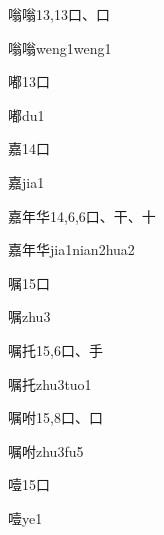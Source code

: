 \begin{entry}{嗡嗡}{13,13}{⼝、⼝}
  \begin{phonetics}{嗡嗡}{weng1weng1}
  \end{phonetics}
\end{entry}

\begin{entry}{嘟}{13}{⼝}
  \begin{phonetics}{嘟}{du1}
  \end{phonetics}
\end{entry}

\begin{entry}{嘉}{14}{⼝}
  \begin{phonetics}{嘉}{jia1}
  \end{phonetics}
\end{entry}

\begin{entry}{嘉年华}{14,6,6}{⼝、⼲、⼗}
  \begin{phonetics}{嘉年华}{jia1nian2hua2}
  \end{phonetics}
\end{entry}

\begin{entry}{嘱}{15}{⼝}
  \begin{phonetics}{嘱}{zhu3}
  \end{phonetics}
\end{entry}

\begin{entry}{嘱托}{15,6}{⼝、⼿}
  \begin{phonetics}{嘱托}{zhu3tuo1}
  \end{phonetics}
\end{entry}

\begin{entry}{嘱咐}{15,8}{⼝、⼝}
  \begin{phonetics}{嘱咐}{zhu3fu5}
  \end{phonetics}
\end{entry}

\begin{entry}{噎}{15}{⼝}
  \begin{phonetics}{噎}{ye1}
  \end{phonetics}
\end{entry}

